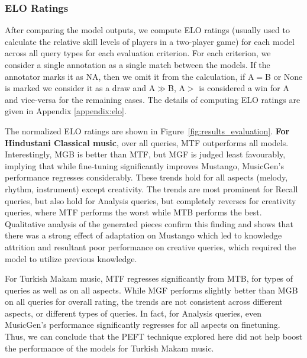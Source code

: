\subsubsection{ELO Ratings}
After comparing the model outputs, we compute ELO ratings (usually used to calculate the relative skill levels of players in a two-player game) for each model across all query types for each evaluation criterion.
For each criterion, we consider a single annotation as a single match between the models. If the annotator marks it as NA, then we omit it from the calculation, if A$=$B or None is marked we consider it as a draw and A$\gg$B, A$>$ is considered a win for A and vice-versa for the remaining cases. The details of computing ELO ratings are given in Appendix \ref{appendix:elo}.

The normalized ELO ratings are shown in Figure~\ref{fig:results_evaluation}. \textbf{For Hindustani Classical music}, over all queries, MTF outperforms all models. Interestingly, MGB is better than MTF, but MGF is judged least favourably, implying that while fine-tuning significantly improves Mustango, MusicGen's performance regresses considerably. These trends hold for all aspects (melody, rhythm, instrument) except creativity. The trends are most prominent for Recall queries, but also hold for Analysis queries, but completely reverses for creativity queries, where MTF performs the worst while MTB performs the best. Qualitative analysis of the generated pieces confirm this finding and shows that there was a strong effect of adaptation on Mustango which led to knowledge attrition and resultant poor performance on creative queries, which required the model to utilize previous knowledge.

For Turkish Makam music, MTF regresses significantly from MTB, for types of queries as well as on all aspects. While MGF performs slightly better than MGB on all queries for overall rating, the trends are not consistent across different aspects, or different types of queries. In fact, for Analysis queries, even MusicGen's performance significantly regresses for all aspects on finetuning. Thus, we can conclude that the PEFT technique explored here did not help boost the performance of the models for Turkish Makam music. 



